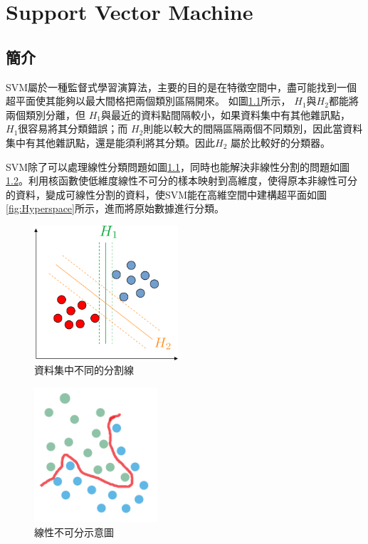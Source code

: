\chapter{Support Vector Machine }
\label{chapter:SVM}
\section{簡介}
\label{sec:SVMIntroduction}
SVM屬於一種監督式學習演算法，主要的目的是在特徵空間中，盡可能找到一個超平面使其能夠以最大間格把兩個類別區隔開來。
如圖\ref{fig:SVMBestSeparte}所示， \(H_1\)與\(H_2\)都能將兩個類別分離，但 \(H_1\)與最近的資料點間隔較小，如果資料集中有其他雜訊點， \(H_1\)很容易將其分類錯誤；而 \(H_2\)則能以較大的間隔區隔兩個不同類別，因此當資料集中有其他雜訊點，還是能須利將其分類。因此\(H_2\) 屬於比較好的分類器。

SVM除了可以處理線性分類問題如圖\ref{fig:SVMBestSeparte}，同時也能解決非線性分割的問題如圖\ref{fig:LinearUnseparable}。利用核函數使低維度線性不可分的樣本映射到高維度，使得原本非線性可分的資料，變成可線性分割的資料，使SVM能在高維空間中建構超平面如圖\ref{fig:Hyperspace}所示，進而將原始數據進行分類。

\begin{figure}[H]
	\centerline{\includegraphics[height=5cm]{./pic/PnmhVqej.png}}
	\caption{資料集中不同的分割線}
	\label{fig:SVMBestSeparte}
\end{figure}

\begin{figure}[H]
	\centerline{\includegraphics[height=5cm]{pic/unlinear.PNG}}
	\caption{線性不可分示意圖}
	\label{fig:LinearUnseparable}
\end{figure}

